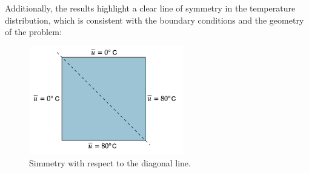 Additionally, the results highlight a clear line of symmetry in the temperature distribution, which is consistent with the boundary conditions and the geometry of the problem:
\begin{figure}[H]
    \centering
    \includegraphics[width=0.6\textwidth]{Images/ab2/ab19.png}
    \caption{Simmetry with respect to the diagonal line.}
    \label{fig:ab19}
\end{figure}



